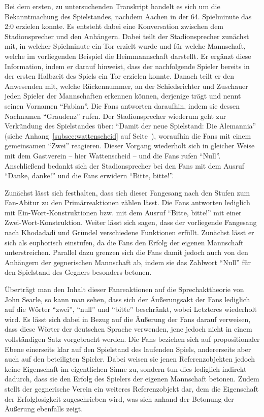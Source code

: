 Bei dem ersten, zu untersuchenden Transkript handelt es sich um die Bekanntmachung des Spielstandes, nachdem Aachen in der 64. Spielminute das 2:0 erzielen konnte.
Es entsteht dabei eine Konversation zwischen dem Stadionsprecher und den Anhängern.
Dabei teilt der Stadionsprecher zunächst mit, in welcher Spielminute ein Tor erzielt wurde und für welche Mannschaft, welche im vorliegenden Beispiel die Heimmannschaft darstellt.
Er ergänzt diese Information, indem er darauf hinweist, dass der nachfolgende Spieler bereits in der ersten Halbzeit des Spiels ein Tor erzielen konnte.
Danach teilt er den Anwesenden mit, welche Rückennummer, an der Schiedsrichter und Zuschauer jeden Spieler der Mannschaften erkennen können, derjenige trägt und nennt seinen Vornamen "`Fabian"'.
Die Fans antworten daraufhin, indem sie dessen Nachnamen "`Graudenz"' rufen.
Der Stadionsprecher wiederum geht zur Verkündung des Spielstandes über: "`Damit der neue Spielstand: Die Alemannia"' (siehe Anhang~\ref{subsec:wattenscheid} auf Seite~\pageref{subsec:wattenscheid}), woraufhin die Fans mit einem gemeinsamen "`Zwei"' reagieren.
Dieser Vorgang wiederholt sich in gleicher Weise mit dem Gastverein – hier Wattenscheid – und die Fans rufen "`Null"'.
Anschließend bedankt sich der Stadionsprecher bei den Fans mit dem Ausruf "`Danke, danke!"' und die Fans erwidern "`Bitte, bitte!"'.

Zunächst lässt sich festhalten, dass sich dieser Fangesang nach den Stufen zum Fan-Abitur zu den Primärreaktionen zählen lässt.
Die Fans antworten lediglich mit Ein-Wort-Konstruktionen bzw. mit dem Ausruf "`Bitte, bitte!"' mit einer Zwei-Wort-Konstruktion.
Weiter lässt sich sagen, dass der vorliegende Fangesang nach Khodadadi und Gründel verschiedene Funktionen erfüllt.
Zunächst lässt er sich als euphorisch einstufen, da die Fans den Erfolg der eigenen Mannschaft unterstreichen.
Parallel dazu grenzen sich die Fans damit jedoch auch von den Anhängern der gegnerischen Mannschaft ab, indem sie das Zahlwort "`Null"' für den Spielstand des Gegners besonders betonen.

Überträgt man den Inhalt dieser Fanreaktionen auf die Sprechakttheorie von John Searle, so kann man sehen, dass sich der Äußerungsakt der Fans lediglich auf die Wörter "`zwei"', "`null"' und "`bitte"' beschränkt, wobei Letzteres wiederholt wird.
Es lässt sich dabei in Bezug auf die Äußerung der Fans darauf verweisen, dass diese Wörter der deutschen Sprache verwenden, jene jedoch nicht in einem vollständigen Satz vorgebracht werden.
Die Fans beziehen sich auf propositionaler Ebene einerseits klar auf den Spielstand des laufenden Spiels, andererseits aber auch auf den beteiligten Spieler.
Dabei weisen sie jenen Referenzobjekten jedoch keine Eigenschaft im eigentlichen Sinne zu, sondern tun dies lediglich indirekt dadurch, dass sie den Erfolg des Spielers der eigenen Mannschaft betonen.
Zudem stellt der gegnerische Verein ein weiteres Referenzobjekt dar, dem die Eigenschaft der Erfolglosigkeit zugeschrieben wird, was sich anhand der Betonung der Äußerung ebenfalls zeigt.

